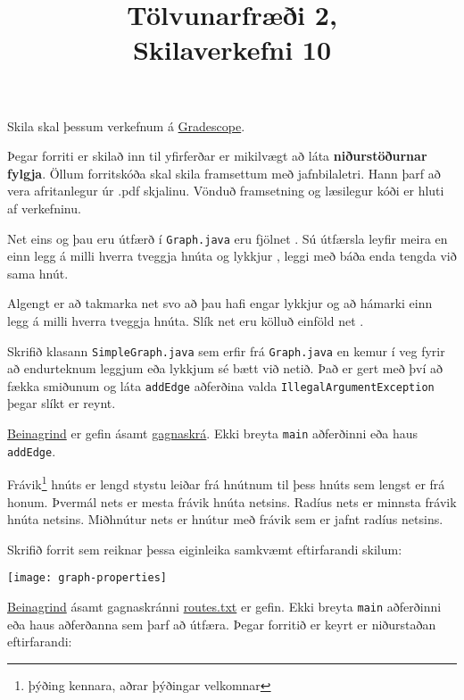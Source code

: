 \documentclass{article}
\title{Tölvunarfræði 2, \semester \\ Skilaverkefni 10}
\author{}
\begin{document}
\maketitle
{}

Skila skal þessum verkefnum á \href{https://gradescope.com/courses/14122}{Gradescope}.

Þegar forriti er skilað inn til yfirferðar er mikilvægt að láta \textbf{niðurstöðurnar fylgja}. Öllum forritskóða skal skila framsettum með jafnbilaletri. Hann þarf að vera afritanlegur úr .pdf skjalinu. Vönduð framsetning og læsilegur kóði er hluti af verkefninu.

\question
Net eins og þau eru útfærð í \texttt{Graph.java} eru fjölnet . Sú útfærsla leyfir meira en einn legg á milli hverra tveggja hnúta og lykkjur , leggi með báða enda tengda við sama hnút.

Algengt er að takmarka net svo að þau hafi engar lykkjur og að hámarki einn legg á milli hverra tveggja hnúta. Slík net eru kölluð einföld net .

Skrifið klasann \texttt{SimpleGraph.java} sem erfir frá \texttt{Graph.java} en kemur í veg fyrir að endurteknum leggjum eða lykkjum sé bætt við netið. Það er gert með því að fækka smiðunum og láta \texttt{addEdge} aðferðina valda \texttt{IllegalArgumentException} þegar slíkt er reynt.

\href{https://raw.githubusercontent.com/Ernir/kennsluefni/master/T2/Code/w11/SimpleGraph.java}{Beinagrind} er gefin ásamt \href{https://raw.githubusercontent.com/Ernir/kennsluefni/master/T2/Code/w11/tinyG.txt}{gagnaskrá}. Ekki breyta \texttt{main} aðferðinni eða haus \texttt{addEdge}. 

\question
Frávik\footnote{þýðing kennara, aðrar þýðingar velkomnar}  hnúts er lengd stystu leiðar frá hnútnum til þess hnúts sem lengst er frá honum. Þvermál  nets er mesta frávik hnúta netsins. Radíus  nets er minnsta frávik hnúta netsins. Miðhnútur  nets er hnútur með frávik sem er jafnt radíus netsins.

Skrifið forrit sem reiknar þessa eiginleika samkvæmt eftirfarandi skilum:

\begin{center}
\texttt{[image: graph-properties]}
\end{center}

\href{https://raw.githubusercontent.com/Ernir/kennsluefni/master/T2/Code/w11/GraphProperties.java}{Beinagrind} ásamt gagnaskránni \href{https://raw.githubusercontent.com/Ernir/kennsluefni/master/T2/Code/w11/routes.txt}{routes.txt} er gefin. Ekki breyta \texttt{main} aðferðinni eða haus aðferðanna sem þarf að útfæra. Þegar forritið er keyrt er niðurstaðan eftirfarandi:
\end{document}
